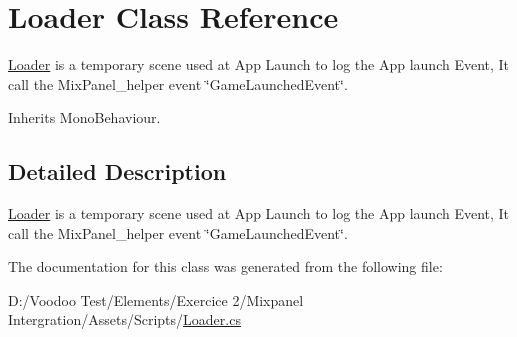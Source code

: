 \hypertarget{class_loader}{}\section{Loader Class Reference}
\label{class_loader}


\mbox{\hyperlink{class_loader}{Loader}} is a temporary scene used at App Launch to log the App launch Event, It call the Mix\+Panel\+\_\+helper event \char`\"{}\+Game\+Launched\+Event\char`\"{}.  




Inherits Mono\+Behaviour.



\subsection{Detailed Description}
\mbox{\hyperlink{class_loader}{Loader}} is a temporary scene used at App Launch to log the App launch Event, It call the Mix\+Panel\+\_\+helper event \char`\"{}\+Game\+Launched\+Event\char`\"{}. 

The documentation for this class was generated from the following file\+:\begin{DoxyCompactItemize}
\item 
D\+:/\+Voodoo Test/\+Elements/\+Exercice 2/\+Mixpanel Intergration/\+Assets/\+Scripts/\mbox{\hyperlink{_loader_8cs}{Loader.\+cs}}\end{DoxyCompactItemize}
